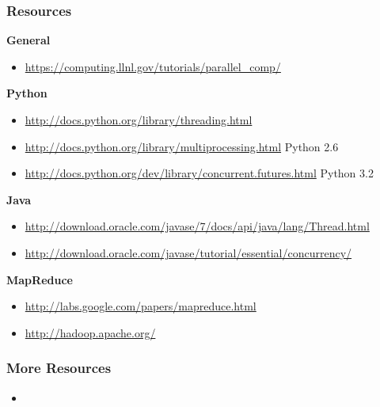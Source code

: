 \documentclass{beamer}
\begin{document}
\begin{frame}
\frametitle{Resources}
\textbf{General}
\begin{itemize}
  \item \url{https://computing.llnl.gov/tutorials/parallel_comp/}
\end{itemize}

\textbf{Python}
\begin{itemize}
  \item \url{http://docs.python.org/library/threading.html}
  \item \url{http://docs.python.org/library/multiprocessing.html} \tiny{Python 2.6}
  \item \url{http://docs.python.org/dev/library/concurrent.futures.html} \tiny{Python 3.2}
\end{itemize}

\textbf{Java}
\begin{itemize}
  \item \url{http://download.oracle.com/javase/7/docs/api/java/lang/Thread.html}
  \item \url{http://download.oracle.com/javase/tutorial/essential/concurrency/}
\end{itemize}

\textbf{MapReduce}
\begin{itemize}
  \item \url{http://labs.google.com/papers/mapreduce.html}
  \item \url{http://hadoop.apache.org/}
\end{itemize}
\end{frame}

\begin{frame}
\frametitle{More Resources}
\begin{itemize}
  \item
\end{itemize}
\end{frame}

\frame{\tableofcontents}

\frame{\titlepage}
\end{document}

